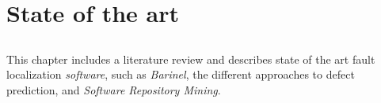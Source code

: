 \chapter{State of the art} \label{chap:sota}

\section*{}

This chapter includes a literature review and describes state of the art fault localization \emph{software}, such as \emph{Barinel}, the different approaches to defect prediction, and \emph{Software Repository Mining}.





